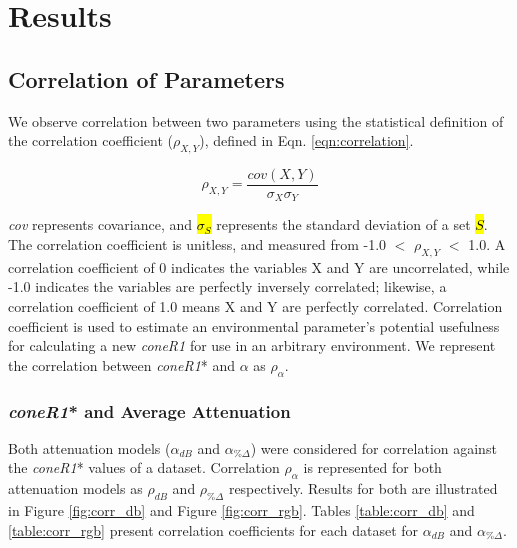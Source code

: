 \clearpage
\chapter{Results}

\section{Correlation of Parameters} \label{section:corrofparams}

We observe correlation between two parameters using the statistical definition of the correlation coefficient ($\rho_{X,Y}$), defined in Eqn. \ref{eqn:correlation}.

\begin{equation}
\rho_{X,Y} = \dfrac{cov(X,Y)}{\sigma_X\sigma_Y}
\label{eqn:correlation}
\end{equation}

\textit{cov} represents covariance, and \hl{$\sigma_{S}$} represents the standard deviation of a set \hl{$S$}. The correlation coefficient is unitless, and measured from -1.0 $<$ $\rho_{X,Y}$ $<$ 1.0. A correlation coefficient of 0 indicates the variables X and Y are uncorrelated, while -1.0 indicates the variables are perfectly inversely correlated; likewise, a correlation coefficient of 1.0 means X and Y are perfectly correlated. Correlation coefficient is used to estimate an environmental parameter's potential usefulness for calculating a new \textit{coneR1} for use in an arbitrary environment. We represent the correlation between \textit{coneR1}* and $\alpha$ as $\rho_{\alpha}$.

\subsection{\textit{coneR1}* and Average Attenuation} \label{section:coner1andatten}

Both attenuation models ($\alpha_{dB}$ and $\alpha_{\%\Delta}$) were considered for correlation against the \textit{coneR1}* values of a dataset. Correlation $\rho_{\alpha}$ is represented for both attenuation models as $\rho_{dB}$ and $\rho_{\%\Delta}$ respectively. Results for both are illustrated in Figure \ref{fig:corr_db} and Figure \ref{fig:corr_rgb}. Tables \ref{table:corr_db} and \ref{table:corr_rgb} present correlation coefficients for each dataset for $\alpha_{dB}$ and $\alpha_{\%\Delta}$.

